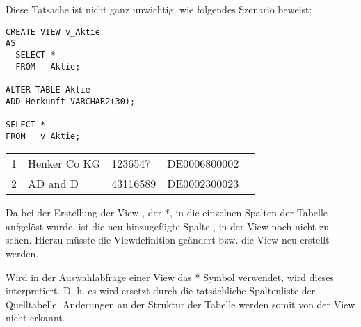 \clearpage
        Diese Tatsache ist nicht ganz unwichtig, wie folgendes Szenario beweist:
        \begin{lstlisting}[language=oracle_sql,caption={Eine Szenario mit T\"ucke},label=sql08_28]
CREATE VIEW v_Aktie
AS
  SELECT *
  FROM   Aktie;

ALTER TABLE Aktie
ADD Herkunft VARCHAR2(30);

SELECT *
FROM   v_Aktie;
        \end{lstlisting}
        \begin{center}
          \begin{small}
            \tablehead{}
            \begin{msoraclesql}
              \begin{supertabular}{rllll}
                1 & Henker Co KG & 1236547 & DE0006800002  \\
                2 & AD and D & 43116589 & DE0002300023  \\
              \end{supertabular}
            \end{msoraclesql}
          \end{small}
        \end{center}
        Da bei der Erstellung der View , der *, in die einzelnen Spalten der Tabelle  aufgel\"ost wurde, ist die neu hinzugef\"ugte Spalte , in der View  noch nicht zu sehen. Hierzu m\"usste die Viewdefinition ge\"andert bzw. die View neu erstellt werden.
        \begin{merke}
          Wird in der Auswahlabfrage einer View das * Symbol verwendet, wird dieses interpretiert. D. h. es wird ersetzt durch die tats\"achliche Spaltenliste der Quelltabelle. \"Anderungen an der Struktur der Tabelle werden somit von der View nicht erkannt.
        \end{merke}
